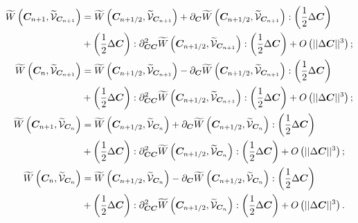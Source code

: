 \begin{equation}\label{eqn:Taylor series for W}
\begin{aligned}
\widetilde{W}\left(\vect{C}_{n+1},\widetilde{\mathcal{V}}_{\vect{C}_{n+1}}\right) & = 
\widetilde{W}\left(\vect{C}_{n+1/2},\widetilde{\mathcal{V}}_{\vect{C}_{n+1}}\right) + \partial_{\vect{C}}\widetilde{W}\left(\vect{C}_{n+1/2},\widetilde{\mathcal{V}}_{\vect{C}_{n+1}}\right):\left(\frac{1}{2}\Delta\vect{C}\right)\\&
%
+\left(\frac{1}{2}\Delta\vect{C}\right):{\partial_{\vect{CC}}^2\widetilde{W}\left(\vect{C}_{n+1/2},\widetilde{\mathcal{V}}_{\vect{C}_{n+1}}\right)}:\left(\frac{1}{2}\Delta\vect{C}\right) + O\left(\vert\vert\Delta\vect{C}\vert\vert^3\right);\\
%
%
\widetilde{W}\left(\vect{C}_{n},\widetilde{\mathcal{V}}_{\vect{C}_{n+1}}\right) & = 
\widetilde{W}\left(\vect{C}_{n+1/2},\widetilde{\mathcal{V}}_{\vect{C}_{n+1}}\right) - \partial_{\vect{C}}\widetilde{W}\left(\vect{C}_{n+1/2},\widetilde{\mathcal{V}}_{\vect{C}_{n+1}}\right):\left(\frac{1}{2}\Delta\vect{C}\right)\\&
%
+\left(\frac{1}{2}\Delta\vect{C}\right):{\partial^2_{\vect{C}\vect{C}}\widetilde{W}\left(\vect{C}_{n+1/2},\widetilde{\mathcal{V}}_{\vect{C}_{n+1}}\right)}:\left(\frac{1}{2}\Delta\vect{C}\right) + O\left(\vert\vert\Delta\vect{C}\vert\vert^3\right);\\
%
%
%
\widetilde{W}\left(\vect{C}_{n+1},\widetilde{\mathcal{V}}_{\vect{C}_{n}}\right) & = 
\widetilde{W}\left(\vect{C}_{n+1/2},\widetilde{\mathcal{V}}_{\vect{C}_{n}}\right) + \partial_{\vect{C}}\widetilde{W}\left(\vect{C}_{n+1/2},\widetilde{\mathcal{V}}_{\vect{C}_{n}}\right):\left(\frac{1}{2}\Delta\vect{C}\right)\\&
%
+\left(\frac{1}{2}\Delta\vect{C}\right):{\partial_{\vect{CC}}^2\widetilde{W}\left(\vect{C}_{n+1/2},\widetilde{\mathcal{V}}_{\vect{C}_{n}}\right)}:\left(\frac{1}{2}\Delta\vect{C}\right) + O\left(\vert\vert\Delta\vect{C}\vert\vert^3\right);\\
%
%
\widetilde{W}\left(\vect{C}_{n},\widetilde{\mathcal{V}}_{\vect{C}_{n}}\right) & = 
\widetilde{W}\left(\vect{C}_{n+1/2},\widetilde{\mathcal{V}}_{\vect{C}_{n}}\right) - \partial_{\vect{C}}\widetilde{W}\left(\vect{C}_{n+1/2},\widetilde{\mathcal{V}}_{\vect{C}_{n}}\right):\left(\frac{1}{2}\Delta\vect{C}\right)\\&
%
+\left(\frac{1}{2}\Delta\vect{C}\right):{\partial_{\vect{CC}}^2\widetilde{W}\left(\vect{C}_{n+1/2},\widetilde{\mathcal{V}}_{\vect{C}_{n}}\right)}:\left(\frac{1}{2}\Delta\vect{C}\right) + O\left(\vert\vert\Delta\vect{C}\vert\vert^3\right).
%
%
\end{aligned}
\end{equation}

